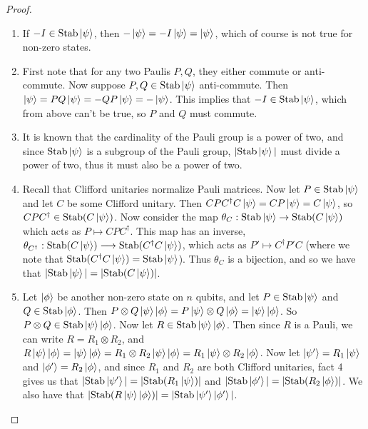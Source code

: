 \documentclass[12pt]{dalthesis}
\begin{document}
\begin{proof}
\hspace{20mm}
\begin{enumerate}
\item If $-I \in \text{Stab}\ket{\psi}$, then $-\ket{\psi} =-I\ket{\psi} = \ket{\psi}$, which of course is not true for non-zero states.

\item First note that for any two Paulis $P, Q$, they either commute or anti-commute. Now suppose $P, Q \in \text{Stab}\ket{\psi}$ anti-commute. Then $\ket{\psi} = PQ\ket{\psi} = -QP\ket{\psi} = -\ket{\psi}$. This implies that $-I \in \text{Stab}\ket{\psi}$, which from above can't be true, so $P$ and $Q$ must commute.

\item It is known that the cardinality of the Pauli group is a power of two, and since $\text{Stab}\ket{\psi}$ is a subgroup of the Pauli group, $|\text{Stab}\ket{\psi}|$ must divide a power of two, thus it must also be a power of two.

\item Recall that Clifford unitaries normalize Pauli matrices. Now let $P \in \text{Stab}\ket{\psi}$ and let $C$ be some Clifford unitary. Then $CPC^{\dag}C\ket{\psi} = CP\ket{\psi} = C\ket{\psi}$, so $CPC^{\dag} \in \text{Stab}(C\ket{\psi})$. Now consider the map $\theta_C : \text{Stab}\ket{\psi} \rightarrow \text{Stab}(C\ket{\psi})$ which acts as $P \mapsto CPC^{\dag}$. This map has an inverse, $\theta_{C^\dag}: \text{Stab}(C\ket{\psi}) \longrightarrow \text{Stab}(C^{\dag}C\ket{\psi})$, which acts as $P' \mapsto C^{\dag}P'C$ (where we note that $\text{Stab}(C^{\dag}C\ket{\psi}) = \text{Stab}\ket{\psi}$). Thus $\theta_C$ is a bijection, and so we have that $|\text{Stab}\ket{\psi}| = |\text{Stab}(C\ket{\psi})|$.

\item Let $\ket{\phi}$ be another non-zero state on $n$ qubits, and let $P \in \text{Stab}\ket{\psi}$ and $Q \in \text{Stab}\ket{\phi}$. Then $P \otimes Q \ket{\psi}\ket{\phi} = P\ket{\psi} \otimes Q\ket{\phi} = \ket{\psi}\ket{\phi}$. So $P \otimes Q \in \text{Stab}\ket{\psi}\ket{\phi}$. Now let $R \in \text{Stab}\ket{\psi}\ket{\phi}$. Then since $R$ is a Pauli, we can write $R = R_1 \otimes R_2$, and $R\ket{\psi}\ket{\phi} = \ket{\psi}\ket{\phi} = R_1 \otimes R_2 \ket{\psi}\ket{\phi} = R_1\ket{\psi} \otimes R_2\ket{\phi}$. Now let $\ket{\psi '} = R_1\ket{\psi}$ and $\ket{\phi '} = R_2\ket{\phi}$, and since $R_1$ and $R_2$ are both Clifford unitaries, fact 4 gives us that $|\text{Stab}\ket{\psi '}| = |\text{Stab}(R_1\ket{\psi})|$ and $|\text{Stab}\ket{\phi '}| = |\text{Stab}(R_2\ket{\phi})|$. We also have that $|\text{Stab}(R\ket{\psi}\ket{\phi})| = |\text{Stab}\ket{\psi '}\ket{\phi '}|$.


\end{enumerate}
\end{proof}
\end{document}
